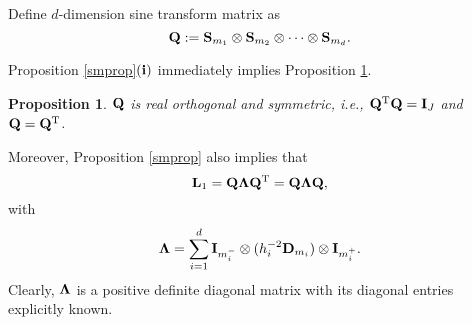 \documentclass[11pt]{article}%
\numberwithin{equation}{section}
\newtheorem{proposition}{Proposition}
\begin{document}
Define $d$-dimension sine transform matrix as
\begin{equation*}
	{\bf Q}:={\bf S}_{m_1}\otimes{\bf S}_{m_2}\otimes\cdots\otimes{\bf S}_{m_d}.
\end{equation*}

Proposition \ref{smprop}${\bf (i)}$ immediately implies Proposition \ref{fstmatprop}.
\begin{proposition}\label{fstmatprop}
	${\bf Q}$ is real orthogonal and symmetric, i.e., ${\bf Q}^{\rm T}{\bf Q}={\bf I}_{J}$ and ${\bf Q}={\bf Q}^{\rm T}$.
\end{proposition}

Moreover, Proposition \ref{smprop} also implies that
\begin{equation}\label{l1diagform}
{\bf L}_1={\bf Q}{\bf \Lambda}{\bf Q}^{\rm T}={\bf Q}{\bf \Lambda}{\bf Q},
\end{equation}
with
\begin{equation*}
{\bf \Lambda}=\sum\limits_{i=1}^{d}{\bf I}_{m_i^{-}}\otimes(h_i^{-2}{\bf D}_{m_i})\otimes{\bf I}_{m_i^{+}}.
\end{equation*}
Clearly, ${\bf \Lambda}$ is a positive definite diagonal matrix with its diagonal entries explicitly known.
\end{document}
